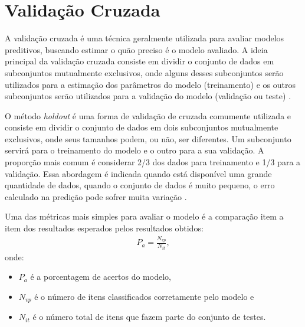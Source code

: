 \section{Validação Cruzada}

A validação cruzada é uma técnica geralmente utilizada para avaliar modelos preditivos, buscando estimar o quão preciso é o modelo avaliado. A ideia principal da validação cruzada consiste em dividir o conjunto de dados em subconjuntos mutualmente exclusivos, onde alguns desses subconjuntos serão utilizados para a estimação dos parâmetros do modelo (treinamento) e os outros subconjuntos serão utilizados para a validação do modelo (validação ou teste) \cite{kohavi1995}.

O método \textit{holdout} é uma forma de validação de cruzada comumente utilizada e consiste em dividir o conjunto de dados em dois subconjuntos mutualmente exclusivos, onde seus tamanhos podem, ou não, ser diferentes. Um subconjunto servirá para o treinamento do modelo e o outro para a sua validação. A proporção mais comum é considerar 2/3 dos dados para treinamento e 1/3 para a validação. Essa abordagem é indicada quando está disponível uma grande quantidade de dados, quando o conjunto de dados é muito pequeno, o erro calculado na predição pode sofrer muita variação \cite{kohavi1995}.

Uma das métricas mais simples para avaliar o modelo é a comparação item a item dos resultados esperados pelos resultados obtidos:
%
\begin{align}
P_{a}=\frac{N_{vp}}{N_{it}},
\end{align}
%
onde:

\begin{itemize}
    \item \(P_{a}\) é a porcentagem de acertos do modelo,
    \item \(N_{vp}\) é o número de itens classificados corretamente pelo modelo e
    \item \(N_{it}\) é o número total de itens que fazem parte do conjunto de testes.
\end{itemize}
